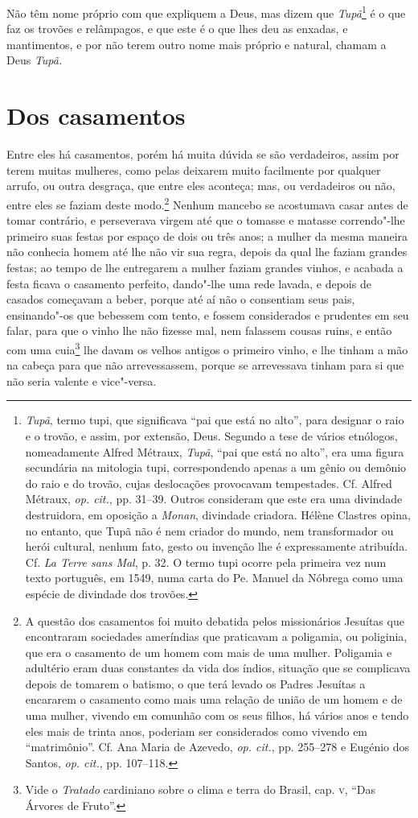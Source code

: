  Não têm nome próprio com que expliquem a Deus, mas dizem que
\textit{Tupã}\footnote{ \textit{Tupã}, termo tupi, que significava
``pai que está no alto'', para designar o raio e o trovão, e assim, por
extensão, Deus. Segundo a tese de vários etnólogos, nomeadamente
Alfred Métraux, \textit{Tupã}, ``pai que está no alto'', era uma figura
secundária na mitologia tupi, correspondendo apenas a um gênio ou
demônio do raio e do trovão, cujas deslocações provocavam tempestades.
Cf. Alfred Métraux, \textit{op. cit.}, pp. 31--39. Outros consideram
que este era uma divindade destruidora, em oposição a \textit{Monan}, 
divindade criadora. Hélène Clastres opina, no entanto, que Tupã não é
nem criador do mundo, nem transformador ou herói cultural, nenhum
fato, gesto ou invenção lhe é expressamente atribuída. Cf. \textit{La
Terre sans Mal}, p. 32. O termo tupi ocorre pela primeira vez num texto
português, em 1549, numa carta do Pe. Manuel da Nóbrega como
uma espécie de divindade dos trovões.} é o que faz os
trovões e relâmpagos, e que este é o que lhes deu as enxadas, e
mantimentos, e por não terem outro nome mais próprio e natural, chamam
a Deus \textit{Tupã.} 

\section{Dos casamentos}
Entre eles há casamentos, porém há muita dúvida se são
verdadeiros, assim por terem muitas mulheres, como pelas deixarem muito
facilmente por qualquer arrufo, ou outra desgraça, que entre eles
aconteça; mas, ou verdadeiros ou não, entre eles se faziam deste 
modo.\footnote{ A questão dos casamentos foi muito debatida pelos
missionários Jesuítas que encontraram sociedades ameríndias que
praticavam a poligamia, ou poliginia, que era o casamento de um homem
com mais de uma mulher. Poligamia e adultério eram duas constantes da
vida dos índios, situação que se complicava depois de tomarem o
batismo, o que terá levado os Padres Jesuítas a encararem o casamento
como mais uma relação de união de um homem e de uma mulher, vivendo em
comunhão com os seus filhos, há vários anos e tendo eles mais de trinta
anos, poderiam ser considerados como vivendo em ``matrimônio''. Cf. Ana
Maria de Azevedo, \textit{op. cit.}, pp. 255--278 e Eugénio dos Santos,
\textit{op. cit.}, pp. 107--118.} Nenhum mancebo se acostumava casar
antes de tomar contrário, e perseverava virgem até que o tomasse e
matasse correndo"-lhe primeiro suas festas por espaço de dois ou três
anos; a mulher da mesma maneira não conhecia homem até lhe não vir sua
regra, depois da qual lhe faziam grandes festas; ao tempo de lhe
entregarem a mulher faziam grandes vinhos, e acabada a festa ficava o
casamento perfeito, dando"-lhe uma rede lavada, e depois de casados
começavam a beber, porque até aí não o consentiam seus pais,
ensinando"-os que bebessem com tento, e fossem considerados e prudentes
em seu falar, para que o vinho lhe não fizesse mal, nem falassem
cousas ruins, e então com uma cuia\footnote{ Vide o \textit{Tratado}
cardiniano sobre o clima e terra do Brasil, cap. \textsc{v}, ``Das Árvores de
Fruto''.} lhe davam os velhos antigos o primeiro vinho, e lhe tinham a
mão na cabeça para que não arrevessassem, porque se arrevessava tinham
para si que não seria valente e vice"-versa. 

